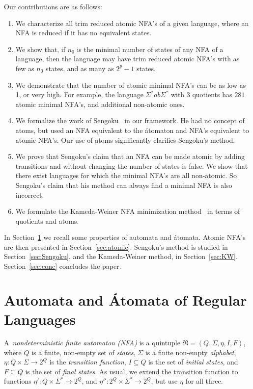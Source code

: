 \documentclass{llncs}
\newcommand{\Sig}{\Sigma}
\newcommand{\be}{\begin{enumerate}}
\newcommand{\ee}{\end{enumerate}}
\newcommand{\fN}{{\mathfrak N}}
\begin{document}
Our contributions are as follows: 
\be
\item 
We characterize all trim reduced atomic NFA's of a given language, where 
an NFA is reduced if it has no equivalent states. 
\item
We show that, if $n_0$ is the minimal number of states of any NFA of a language,  then the language may have trim reduced atomic NFA's 
with as few as $n_0$ states, and as many as $2^p-1$ states.
\item
We demonstrate that the number of atomic minimal NFA's  can be 
as low as 1, or very high. For example, the language $\Sig^*ab\Sig^*$ with 3 
quotients has $281$ atomic minimal NFA's, and additional non-atomic ones.
\item
We formalize the work of Sengoku~\cite{Sen92} in our framework. He had no concept of atoms, but used an NFA equivalent to the \'atomaton 
and NFA's equivalent to atomic NFA's.
Our use of atoms  significantly clarifies Sengoku's method.
\item
We prove that Sengoku's claim that an NFA can be made atomic by adding transitions and without changing the number of states is false.
We show that there exist languages for which the minimal NFA's are all non-atomic. 
So  Sengoku's claim that his method can always find a minimal NFA is also incorrect.
\item
We formulate the Kameda-Weiner NFA minimization method~\cite{KaWe70} in terms of 
quotients and atoms.
\ee 

In Section~\ref{sec:aut} we recall some properties of automata and \'atomata.
Atomic NFA's are then presented in Section~\ref{sec:atomic}.
Sengoku's method is studied in Section~\ref{sec:Sengoku}, and
the Kameda-Weiner method, in Section~\ref{sec:KW}.
Section~\ref{sec:conc} concludes the paper.


\section{Automata and \'Atomata of Regular Languages}
\label{sec:aut}

A~\emph{nondeterministic finite automaton (NFA)} is a quintuple 
$\fN=(Q, \Sig, \eta, I,F)$, where 
$Q$ is a finite, non-empty set of \emph{states}, 
$\Sig$ is a finite non-empty \emph{alphabet}, 
$\eta:Q\times \Sig\to 2^Q$ is the  \emph{transition function},
$I\subseteq  Q$ is the set of  \emph{initial states},
and $F\subseteq Q$ is the set of \emph{final states}.
As usual, we extend the transition function to functions 
$\eta':Q\times \Sig^*\to 2^Q$, and 
$\eta'':2^Q\times \Sig^*\to 2^Q$, but
use 
$\eta$ for all three.
\end{document}
